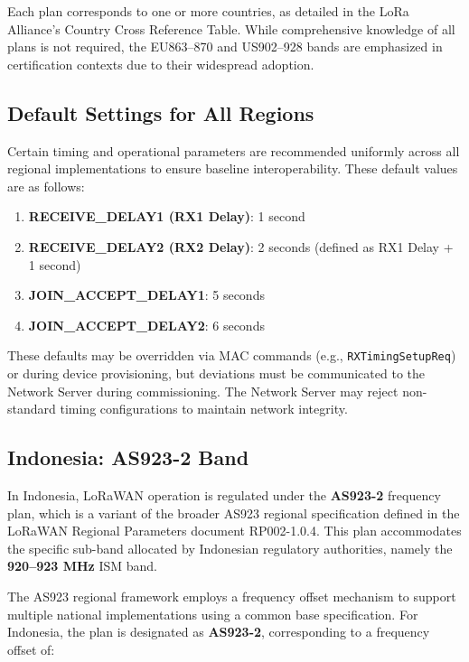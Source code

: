 Each plan corresponds to one or more countries, as detailed in the LoRa Alliance’s Country Cross Reference Table. While comprehensive knowledge of all plans is not required, the EU863–870 and US902–928 bands are emphasized in certification contexts due to their widespread adoption.

\subsection{Default Settings for All Regions}

Certain timing and operational parameters are recommended uniformly across all regional implementations to ensure baseline interoperability. These default values are as follows:

\begin{enumerate}
    \item \textbf{RECEIVE\_DELAY1 (RX1 Delay)}: 1 second
    \item \textbf{RECEIVE\_DELAY2 (RX2 Delay)}: 2 seconds (defined as RX1 Delay + 1 second)
    \item \textbf{JOIN\_ACCEPT\_DELAY1}: 5 seconds
    \item \textbf{JOIN\_ACCEPT\_DELAY2}: 6 seconds
\end{enumerate}

These defaults may be overridden via MAC commands (e.g., \texttt{RXTimingSetupReq}) or during device provisioning, but deviations must be communicated to the Network Server during commissioning. The Network Server may reject non-standard timing configurations to maintain network integrity.

\subsection{Indonesia: AS923-2 Band}
\label{subsec:indonesia_as923}

In Indonesia, LoRaWAN operation is regulated under the \textbf{AS923-2} frequency plan, which is a variant of the broader AS923 regional specification defined in the LoRaWAN Regional Parameters document RP002-1.0.4. This plan accommodates the specific sub-band allocated by Indonesian regulatory authorities, namely the \textbf{920–923 MHz} ISM band.

The AS923 regional framework employs a frequency offset mechanism to support multiple national implementations using a common base specification. For Indonesia, the plan is designated as \textbf{AS923-2}, corresponding to a frequency offset of:

